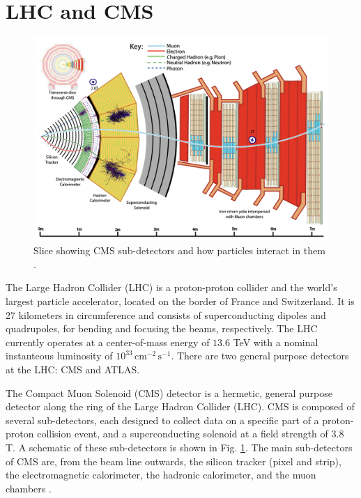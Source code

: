 \documentclass[12pt]{article}
\begin{document}
\section{LHC and CMS}
\begin{figure}
   \centering
   \includegraphics[width=0.8\linewidth]{figures/CMSslice_whiteBackground.png}
   \caption{Slice showing CMS sub-detectors and how particles interact in them \cite{particle_flow_2017}.}
   \label{fig:cms-subdetectors}
\end{figure}

The Large Hadron Collider (LHC) is a proton-proton collider and the world's largest particle accelerator, located on the border of France and Switzerland. It is 27 kilometers in circumference and consists of superconducting dipoles and quadrupoles, for bending and focusing the beams, respectively. The LHC currently operates at a center-of-mass energy of $13.6$ TeV with a nominal instanteous luminosity of $10^{33}\, \text{cm}^{-2}\, \text{s}^{-1}$. There are two general purpose detectors at the LHC: CMS and ATLAS.\par

The Compact Muon Solenoid (CMS) detector is a hermetic, general purpose detector along the ring of the Large Hadron Collider (LHC). CMS is composed of several sub-detectors, each designed to collect data on a specific part of a proton-proton collision event, and a superconducting solenoid at a field strength of $3.8$ T. A schematic of these sub-detectors is shown in Fig. \ref{fig:cms-subdetectors}. The main sub-detectors of CMS are, from the beam line outwards, the silicon tracker (pixel and strip), the electromagnetic calorimeter, the hadronic calorimeter, and the muon chambers \cite{CMS_Collaboration_2008}.\par
\end{document}
